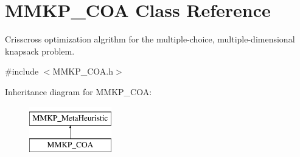 \hypertarget{class_m_m_k_p___c_o_a}{\section{M\+M\+K\+P\+\_\+\+C\+O\+A Class Reference}
\label{class_m_m_k_p___c_o_a}
}


Crisscross optimization algrithm for the multiple-\/choice, multiple-\/dimensional knapsack problem.  




{\ttfamily \#include $<$M\+M\+K\+P\+\_\+\+C\+O\+A.\+h$>$}

Inheritance diagram for M\+M\+K\+P\+\_\+\+C\+O\+A\+:\begin{figure}[H]
\begin{center}
\leavevmode
\includegraphics[height=2.000000cm]{class_m_m_k_p___c_o_a}
\end{center}
\end{figure}
